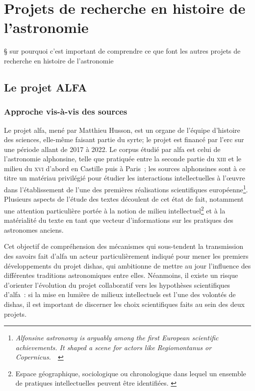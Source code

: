 \documentclass[a4paper,12pt,twoside]{book}
\newcommand{\eng}{\emph}
\newcommand{\XIII}{\textsc{xiii}\ieme{}\xspace}
\newcommand{\XVI}{\textsc{xvi}\ieme{}\xspace}
\newcommand{\g}[1]{\og#1~\fg}
\newcommand{\dishas}{\gls{dishas}\xspace}
\newcommand{\alfa}{\gls{alfa}\xspace}
\newcommand{\syrte}{\gls{syrte}\xspace}
\newcommand{\erc}{\gls{erc}\xspace}
\begin{document}
	\section{Projets de recherche en histoire de l'astronomie}

§ sur pourquoi c'est important de comprendre ce que font les autres projets de recherche en histoire de l'astronomie

		\subsection{Le projet ALFA}
			\subsubsection{Approche vis-à-vis des sources}
Le projet \alfa, mené par Matthieu Husson, est un organe de l'équipe d'histoire des sciences, elle-même faisant partie du \syrte; le projet est financé par l'\erc sur une période allant de 2017 à 2022. Le corpus étudié par \alfa est celui de l'astronomie alphonsine, telle que pratiquée entre la seconde partie du \XIII et le milieu du \XVI d'abord en Castille puis à Paris~; les sources alphonsines sont à ce titre un matériau privilégié pour étudier les interactions intellectuelles à l'œuvre dans l'établissement de l'une des premières réalisations scientifiques européenne\footnote{\g{\eng{Alfonsine astronomy is arguably among the first European scientific achievements. It shaped a scene for actors like Regiomontanus or Copernicus.}}~\cite{ShapingEuropeanScientific}}. Plusieurs aspects de l'étude des textes découlent de cet état de fait, notamment une attention particulière portée à la notion de milieu intellectuel\footnote{Espace géographique, sociologique ou chronologique dans lequel un ensemble de pratiques intellectuelles peuvent être identifiées. \cite{ShapingEuropeanScientific}} et à la matérialité du texte en tant que vecteur d'informations sur les pratiques des astronomes anciens.


Cet objectif de compréhension des mécanismes qui sous-tendent la transmission des savoirs fait d'\alfa un acteur particulièrement indiqué pour mener les premiers développements du projet \dishas, qui ambitionne de mettre au jour l'influence des différentes traditions astronomiques entre elles. Néanmoins, il existe un risque d'orienter l'évolution du projet collaboratif vers les hypothèses scientifiques d'\alfa~: si la mise en lumière de milieux intellectuels est l'une des volontés de \dishas, il est important de discerner les choix scientifiques faits au sein des deux projets.
\end{document}
